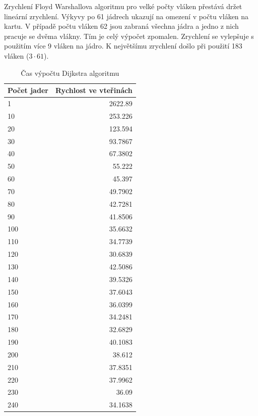 \documentclass[a4paper,10pt]{article}
\begin{document}
Zrychlení Floyd Warshallova algoritmu pro velké počty vláken přestává držet lineární zrychlení. Výkyvy po 61 jádrech ukazují na omezení v počtu vláken na kartu. V případě počtu vláken 62 jsou zabraná všechna jádra a jedno z nich pracuje se dvěma vlákny. Tím je celý výpočet zpomalen. Zrychlení se vylepšuje s použitím více 9 vláken na jádro. K největšímu zrychlení došlo při použití 183 vláken ($3 \cdot 61$).

\begin{table}[H]
  \centering
	\caption{Čas výpočtu Dijkstra algoritmu}
	\begin{tabular}{| l | r |}
\hline
Počet jader & Rychlost ve vteřinách \\ \hline
1 & 2622.89 \\ \hline
10 & 253.226 \\ \hline
20 & 123.594 \\ \hline
30 & 93.7867 \\ \hline
40 & 67.3802 \\ \hline
50 & 55.222 \\ \hline
60 & 45.397 \\ \hline
70 & 49.7902 \\ \hline
80 & 42.7281 \\ \hline
90 & 41.8506 \\ \hline
100 & 35.6632 \\ \hline
110 & 34.7739 \\ \hline
120 & 30.6839 \\ \hline
130 & 42.5086 \\ \hline
140 & 39.5326 \\ \hline
150 & 37.6043 \\ \hline
160 & 36.0399 \\ \hline
170 & 34.2481 \\ \hline
180 & 32.6829 \\ \hline
190 & 40.1083 \\ \hline
200 & 38.612 \\ \hline
210 & 37.8351 \\ \hline
220 & 37.9962 \\ \hline
230 & 36.09 \\ \hline
240 & 34.1638 \\ \hline

	\end{tabular}
  \label{tab:daph}
\end{table}
\end{document}
